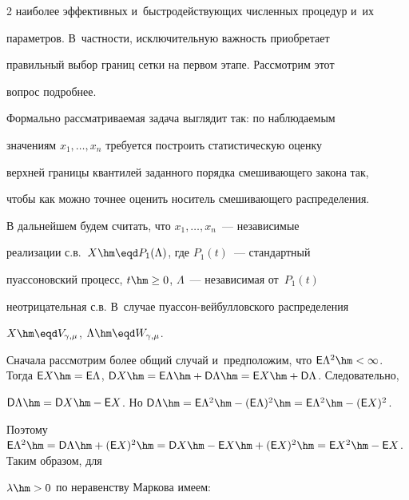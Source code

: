\begin{multicols}{2}
наиболее эффективных и~быстродействующих численных процедур и~их


параметров. В~част\-ности, исключительную важность приобретает


правильный выбор границ сетки на первом этапе. Рас\-смот\-рим этот


вопрос подробнее.





Формально рассматриваемая задача выглядит так: по наблюдаемым


значениям $x_1,\ldots,x_n$ требуется построить статистическую оценку


верхней границы квантилей заданного порядка сме\-ши\-ва\-юще\-го закона так,


чтобы как можно точнее оценить носитель смешивающего распределения.





В дальнейшем будем считать, что $x_1,\ldots,x_n$~--- независимые


реализации с.в.\  $X\hm\eqd P_1(\Lambda)$, где $P_1(t)$~--- стандартный


пуассоновский процесс, $t\hm\ge0$, $\Lambda$~--- независимая от~$P_1(t)$


неотрицательная с.в. В~случае пу\-ас\-сон-вей\-бул\-лов\-ско\-го распределения


$X\hm\eqd V_{\gamma,\mu}$, $\Lambda\hm\eqd W_{\gamma,\mu}$.





Сначала рассмотрим более общий случай и~предположим, что ${\sf E}


\Lambda^2\hm<\infty$. Тогда ${\sf E}X\hm={\sf E}\Lambda$, ${\sf D}X\hm=


{\sf E}\Lambda\hm+{\sf D}\Lambda\hm={\sf E}X\hm+{\sf D}\Lambda$. Следовательно,


${\sf D}\Lambda\hm={\sf D}X\hm-{\sf E}X$. Но ${\sf D}\Lambda\hm={\sf E}


\Lambda^2\hm-({\sf E}\Lambda)^2\hm={\sf E}\Lambda^2\hm-({\sf E}X)^2$.


Поэтому ${\sf E}\Lambda^2\hm={\sf D}\Lambda\hm+({\sf E}X)^2\hm={\sf D}X\hm-


{\sf E}X\hm+({\sf E}X)^2\hm={\sf E}X^2\hm-{\sf E}X$. Таким образом, для


$\lambda\hm>0$ по неравенству Маркова имеем:


\begin{equation}



\end{equation}
\end{multicols}
